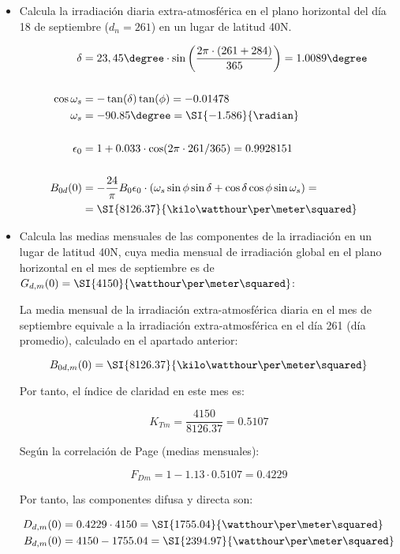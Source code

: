 \begin{itemize}
\item Calcula la irradiación diaria extra-atmosférica en el plano
  horizontal del día 18 de septiembre ($d_n = 261$) en un lugar de
  latitud 40\degree N.

\begin{align*}
  \delta &= 23,45\degree\cdot\sin\left(\frac{2\pi\cdot\left(261+284\right)}{365}\right) = 1.0089\degree\\
  \\
  \cos \omega_s &= -\tan(\delta) \tan(\phi) = -0.01478\\
  \omega_s &= -90.85\degree = \SI{-1.586}{\radian}\\
  \\
  \epsilon_0 &= 1+0.033\cdot\cos(2\pi\cdot261/365) = 0.9928151\\
  \\
  B_{0d}(0) &= -\frac{24}{\pi}B_{0}\epsilon_{0}\cdot\left(\omega_{s}\sin\phi\sin\delta+\cos\delta\cos\phi\sin\omega_{s}\right) = \\
         &= \SI{8126.37}{\kilo\watthour\per\meter\squared}
\end{align*}

\item Calcula las medias mensuales de las componentes de la
  irradiación en un lugar de latitud 40\degree N, cuya media mensual
  de irradiación global en el plano horizontal en el mes de septiembre
  es de $G_{d,m}(0) = \SI{4150}{\watthour\per\meter\squared}$:

  La media mensual de la irradiación extra-atmosférica diaria en el
  mes de septiembre equivale a la irradiación extra-atmosférica en el
  día 261 (día promedio), calculado en el apartado anterior:

\[
  B_{0d,m}(0) = \SI{8126.37}{\kilo\watthour\per\meter\squared}
\]

Por tanto, el índice de claridad en este mes es:

\[
  K_{Tm}=\frac{4150}{8126.37}=0.5107
\]

Según la correlación de Page (medias mensuales):

\[
  F_{Dm} = 1 - 1.13 \cdot 0.5107 = 0.4229
\]

Por tanto, las componentes difusa y directa son:

\begin{align*}
  D_{d,m}(0) &= 0.4229 \cdot 4150 = \SI{1755.04}{\watthour\per\meter\squared}\\
  B_{d,m}(0) &= 4150 - 1755.04 = \SI{2394.97}{\watthour\per\meter\squared}  
\end{align*}



\end{itemize}

